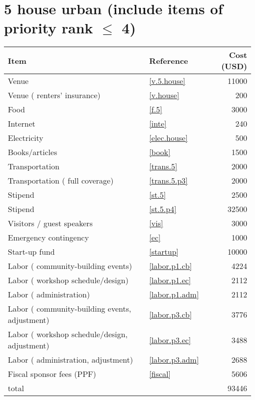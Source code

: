 \section*{5 house urban (include items of priority rank $\leq$ 4)}
\begin{center}
\begin{tabular}{llr}
Item & Reference & Cost (USD) \\ \hline
Venue & \ref{v.5.house} & 11000 \\
Venue ( renters' insurance) & \ref{v.house} & 200 \\
Food & \ref{f.5} & 3000 \\
Internet & \ref{inte} & 240 \\
Electricity & \ref{elec.house} & 500 \\
Books/articles & \ref{book} & 1500 \\
Transportation & \ref{trans.5} & 2000 \\
Transportation ( full coverage) & \ref{trans.5.p3} & 2000 \\
Stipend & \ref{st.5} & 2500 \\
Stipend & \ref{st.5.p4} & 32500 \\
Visitors / guest speakers & \ref{vis} & 3000 \\
Emergency contingency & \ref{ec} & 1000 \\
Start-up fund & \ref{startup} & 10000 \\
Labor ( community-building events) & \ref{labor.p1.cb} & 4224 \\
Labor ( workshop schedule/design) & \ref{labor.p1.ec} & 2112 \\
Labor ( administration) & \ref{labor.p1.adm} & 2112 \\
Labor ( community-building events, adjustment) & \ref{labor.p3.cb} & 3776 \\
Labor ( workshop schedule/design, adjustment) & \ref{labor.p3.ec} & 3488 \\
Labor ( administration, adjustment) & \ref{labor.p3.adm} & 2688 \\
Fiscal sponsor fees (PPF) & \ref{fiscal} & 5606 \\ \hline
total &  & 93446
\end{tabular}
\end{center}
\newpage
